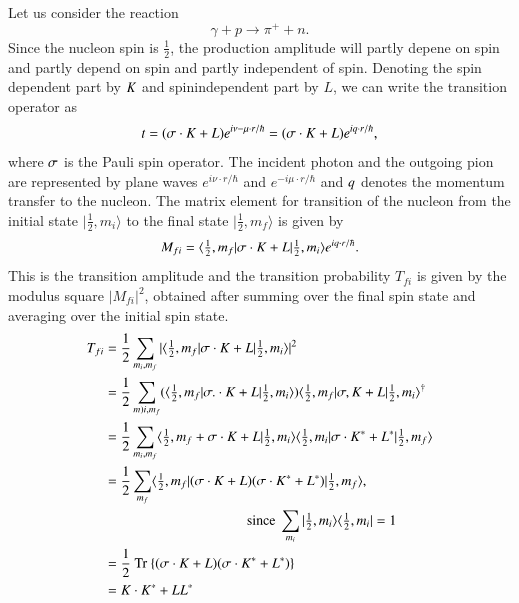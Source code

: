Let us consider the reaction
$$
\gamma + p \to \pi^+ + n.
$$
Since the nucleon spin is $\frac{1}{2}$, the production amplitude will partly depene on spin and partly depend on spin and partly independent of spin. Denoting the spin dependent part by ${\boldmath  K}$ and spinindependent part by $L$, we can write the transition operator as
\setcounter{equation}{30}
\begin{equation}
t= ({\boldmath  \sigma \cdot K} + L) e^{i{\boldmath  \nu- \mu}\cdot {\boldmath  r}/\hbar}= ({\boldmath  \sigma \cdot K} + L) e^{i {\boldmath  q \cdot r}/\hbar}, \label{chap3-eq31}
\end{equation}
where $\boldmath{\sigma}$ is the Pauli spin operator. The incident photon and the outgoing pion are represented by plane waves $e^{i\nu  \cdot r/\hbar}$ and $e^{-i \mu \cdot r /\hbar}$ and ${\boldmath  q}$ denotes the momentum transfer to the nucleon. The matrix element for transition of the nucleon from the initial state $|\frac{1}{2}, m_i \rangle$ to the final state $|\frac{1}{2}, m_f \rangle$ is given by
\begin{equation}
  M_{fi} = \langle \tfrac{1}{2}, m_f | {\boldmath  \sigma \cdot K} + L | \tfrac{1}{2}, m_i \rangle e^{i {\boldmath  q \cdot r}/\hbar}. \label{chap3-eq32}
\end{equation}
This is the transition amplitude and the transition probability $T_{fi}$ is given by the modulus square $|M_{fi}|^2$, obtained after summing over the final spin state and averaging over the initial spin state.
\begin{align}
  T_{fi} & = \frac{1}{2} \sum_{m_i, m_f} | \langle \tfrac{1}{2}, m_f | {\boldmath  \sigma \cdot K} + L | \tfrac{1}{2}, m_i\rangle|^2 \notag \\
  & = \frac{1}{2} \sum_{m)i, m_f} (\langle \tfrac{1}{2}, m_f | {\boldmath  \sigma. \cdot K + L}| \tfrac{1}{2}, m_i \rangle) \langle \tfrac{1}{2}, m_f | {\boldmath  \sigma, K + L}| \tfrac{1}{2}, m_i \rangle^\dagger \notag\\
  & = \frac{1}{2} \sum_{m_i, m_f} \langle \tfrac{1}{2}, m_f + {\boldmath  \sigma \cdot K} + L | \tfrac{1}{2}, m_i \rangle \langle \tfrac{1}{2} , m_i | {\boldmath  \sigma \cdot K^\ast}+ L^\ast| \tfrac{1}{2}, m_f \rangle \notag\\
  & = \frac{1}{2} \sum_{m_f} \langle \tfrac{1}{2}, m_f | ({\boldmath  \sigma \cdot K} + L) ({\boldmath  \sigma \cdot K^\ast} + L^\ast) | \tfrac{1}{2}, m_f \rangle,\notag\\
  & \qquad \qquad \qquad \qquad \qquad ~\text{since}~ \sum_{m_i} |\tfrac{1}{2}, m_i \rangle \langle \tfrac{1}{2}, m_i| =1 \notag\\
  & = \frac{1}{2} ~\text{Tr}~  \{ ({\boldmath  \sigma \cdot K}+L)({\boldmath  \sigma \cdot K^\ast}
  + L^\ast)\}\notag \\
  & = {\boldmath  K \cdot K^\ast} + LL^\ast \label{chap3-eq33}
\end{align}
